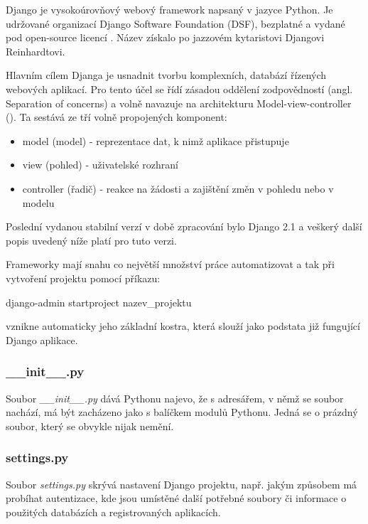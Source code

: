 
Django je vysokoúrovňový webový framework napsaný v jazyce Python. Je udržované organizací Django Software Foundation (DSF), bezplatné a vydané pod open-source licencí . Název získalo po jazzovém kytaristovi Djangovi Reinhardtovi.

Hlavním cílem Djanga je usnadnit tvorbu komplexních, databází řízených webových aplikací. Pro tento účel se řídí zásadou oddělení zodpovědností (angl. Separation of concerns) a volně navazuje na architekturu Model-view-controller (). Ta sestává ze tří volně propojených komponent:
\begin{itemize}
\item model (model) - reprezentace dat, k nimž aplikace přistupuje
\item view (pohled) - uživatelské rozhraní
\item controller (řadič) - reakce na žádosti a zajištění změn v pohledu nebo v modelu
\end{itemize}

Poslední vydanou stabilní verzí v době zpracování bylo Django 2.1 a veškerý další popis uvedený níže platí pro tuto verzi.

Frameworky mají snahu co největší množství práce automatizovat a tak při vytvoření projektu pomocí příkazu:

\begin{center}
\textsf{django-admin startproject nazev\_projektu}
\end{center}

vznikne automaticky jeho základní kostra, která slouží jako podstata již fungující Django aplikace.


\subsubsection{\_\_init\_\_.py}
Soubor \textit{\_\_init\_\_.py} dává Pythonu najevo, že s adresářem, v němž se soubor nachází, má být zacházeno jako s balíčkem modulů Pythonu. Jedná se o prázdný soubor, který se obvykle nijak nemění.

\subsubsection{settings.py}
\label{settings}
Soubor \textit{settings.py} skrývá nastavení Django projektu, např. jakým způsobem má probíhat autentizace, kde jsou umístěné další potřebné soubory či informace o použitých databázích a registrovaných aplikacích.

